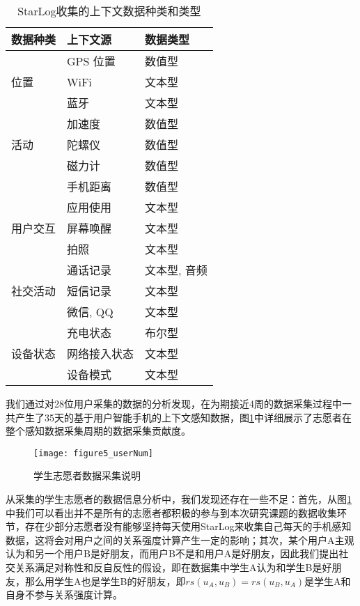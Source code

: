 \begin{center}
\begin{table}[H]
	\renewcommand{\arraystretch}{1.3}
	\caption{StarLog收集的上下文数据种类和类型}
	\vspace{0.01cm}
	\label{tablesource}
	\centering
	\begin{tabular}{p{4cm} p{4cm} p{4cm}}
		\toprule[1.5pt]
		\textbf{数据种类} & \textbf{上下文源} & \textbf{数据类型} \\
		\hline
		& GPS 位置 & 数值型\\
		\cline{2-3}
		位置 & WiFi & 文本型\\
		\cline{2-3}
		& 蓝牙 & 文本型 \\
		\hline
		& 加速度 & 数值型\\
		\cline{2-3}
		活动 & 陀螺仪 & 数值型\\
		\cline{2-3}
		& 磁力计 & 数值型 \\
		\cline{2-3}
		& 手机距离 & 数值型 \\
		\hline
		& 应用使用 & 文本型\\
		\cline{2-3}
		用户交互 & 屏幕唤醒 & 文本型\\
		\cline{2-3}
		& 拍照 & 文本型 \\
		\hline
		& 通话记录 & 文本型, 音频\\
		\cline{2-3}
		社交活动 & 短信记录 & 文本型\\
		\cline{2-3}
		& 微信, QQ & 文本型 \\
		\hline
		& 充电状态 & 布尔型\\
		\cline{2-3}
		设备状态 & 网络接入状态 & 文本型\\
		\cline{2-3}
		& 设备模式 & 文本型 \\
		\bottomrule[1.5pt]
	\end{tabular}
\end{table}
\end{center}

\par 我们通过对28位用户采集的数据的分析发现，在为期接近4周的数据采集过程中一共产生了35天的基于用户智能手机的上下文感知数据，图\ref{fig:userNum}中详细展示了志愿者在整个感知数据采集周期的数据采集贡献度。
\begin{figure}[htb]
\centering
\texttt{[image: figure5\_userNum]}
\caption{学生志愿者数据采集说明}
\label{fig:userNum}
\end{figure}
\par 从采集的学生志愿者的数据信息分析中，我们发现还存在一些不足：首先，从图\ref{fig:userNum}中我们可以看出并不是所有的志愿者都积极的参与到本次研究课题的数据收集环节，存在少部分志愿者没有能够坚持每天使用StarLog来收集自己每天的手机感知数据，这将会对用户之间的关系强度计算产生一定的影响；其次，某个用户A主观认为和另一个用户B是好朋友，而用户B不是和用户A是好朋友，因此我们提出社交关系满足对称性和反自反性的假设，即在数据集中学生A认为和学生B是好朋友，那么用学生A也是学生B的好朋友，即$rs(u_{A},u_{B})=rs(u_{B},u_{A})$是学生A和自身不参与关系强度计算。
